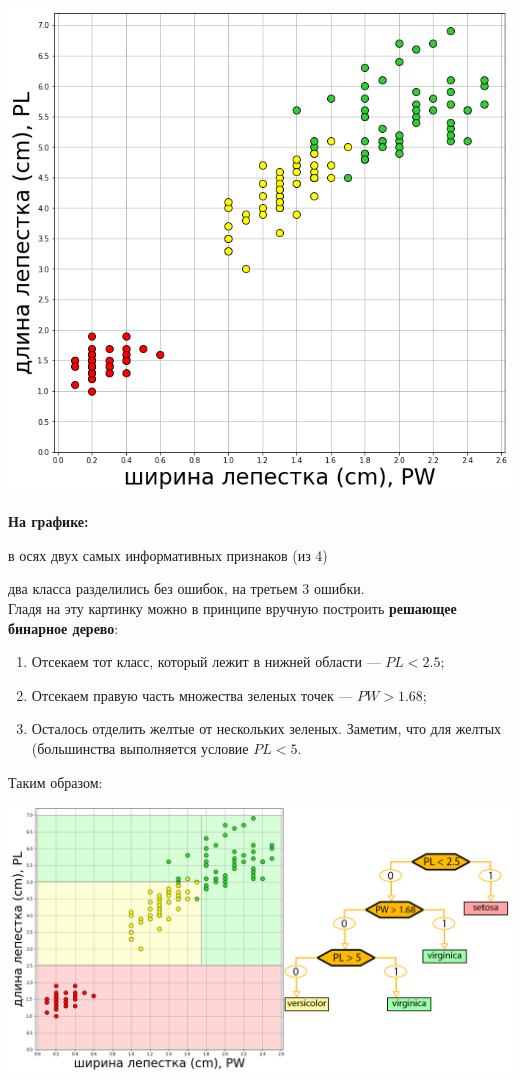 \documentclass{article}
\begin{document}
\begin{center}
    \includegraphics[scale=0.4]{images/3_2.png}
\end{center}

\textbf{На графике:}

в осях двух самых информативных признаков (из 4)

два класса разделились без ошибок, на третьем 3 ошибки.
\\

Гладя на эту картинку можно в принципе вручную построить \textbf{решающее бинарное дерево}:

\begin{enumerate}
\item Отсекаем тот класс, который лежит в нижней области --- $PL < 2.5$;
\item Отсекаем правую часть множества зеленых точек --- $PW > 1.68$;
\item Осталось отделить желтые от нескольких зеленых. Заметим, что для желтых (большинства выполняется условие $PL < 5$.
\end{enumerate}

Таким образом:

\begin{center}
    \includegraphics[scale=0.35]{images/3_3.png}
\end{center}
\end{document}
